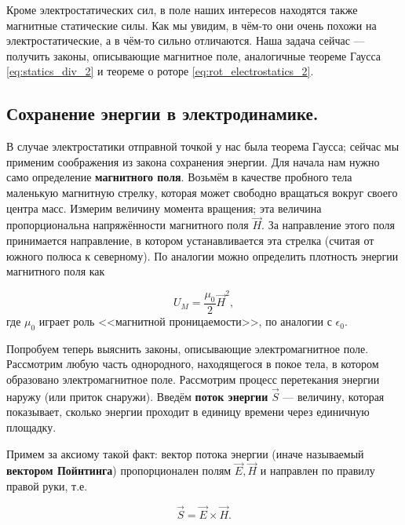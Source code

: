 \documentclass[11pt,a4paper]{article}
\numberwithin{equation}{section}
\newcommand{\eps}{\epsilon}
\begin{document}
Кроме электростатических сил, в поле наших интересов находятся также
магнитные статические силы. Как мы увидим, в чём-то они очень похожи
на электростатические, а в чём-то сильно отличаются. Наша задача
сейчас --- получить законы, описывающие магнитное поле, аналогичные
теореме Гаусса \eqref{eq:statics_div_2} и теореме о роторе
\eqref{eq:rot_electrostatics_2}. 

\subsection{Сохранение энергии в электродинамике.}
\label{sec:conservation_energy}

В случае электростатики отправной точкой у нас была теорема Гаусса;
сейчас мы применим соображения из закона сохранения энергии. Для
начала нам нужно само определение \textbf{магнитного поля}. Возьмём в
качестве пробного тела маленькую магнитную стрелку, которая может
свободно вращаться вокруг своего центра масс. Измерим величину момента
вращения; эта величина пропорциональна напряжённости магнитного поля
$\vec{H}$. За направление этого поля принимается направление, в
котором устанавливается эта стрелка (считая от южного полюса к
северному). По аналогии можно определить плотность энергии магнитного
поля как

\begin{equation}
  \label{eq:def_magnetic_energy}
  U_M = \frac{\mu_0}{2} \vec{H}^2,
\end{equation}
где $\mu_0$ играет роль <<магнитной проницаемости>>, по аналогии с
$\eps_0$. 

Попробуем теперь выяснить законы, описывающие электромагнитное
поле. Рассмотрим любую часть однородного, находящегося в покое тела, в
котором образовано электромагнитное поле. Рассмотрим процесс
перетекания энергии наружу (или приток снаружи). Введём \textbf{поток
  энергии} $\vec{S}$ --- величину, которая показывает, сколько энергии
проходит в единицу времени через единичную площадку.

Примем за аксиому такой факт: вектор потока энергии (иначе называемый
\textbf{вектором Пойнтинга}) пропорционален полям $\vec{E}, \vec{H}$ и
направлен по правилу правой руки, т.е.

\begin{equation}
  \label{eq:def_pointing}
  \vec{S} = \vec{E} \times \vec{H}.
\end{equation}

\end{document}
